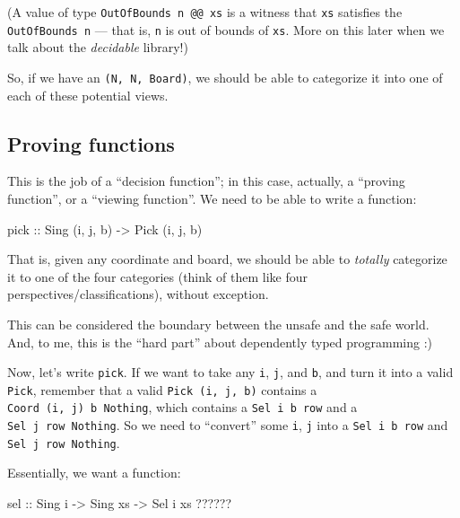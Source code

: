 \documentclass[]{article}
\newenvironment{Shaded}{}{}
\newcommand{\DataTypeTok}[1]{\textcolor[rgb]{0.56,0.13,0.00}{#1}}
\newcommand{\NormalTok}[1]{#1}
\newcommand{\OperatorTok}[1]{\textcolor[rgb]{0.40,0.40,0.40}{#1}}
\newcommand{\OtherTok}[1]{\textcolor[rgb]{0.00,0.44,0.13}{#1}}
\begin{document}
(A value of type \texttt{OutOfBounds\ n\ @@\ xs} is a witness that \texttt{xs}
satisfies the \texttt{OutOfBounds\ n} --- that is, \texttt{n} is out of bounds
of \texttt{xs}. More on this later when we talk about the \emph{decidable}
library!)

So, if we have an \texttt{(N,\ N,\ Board)}, we should be able to categorize it
into one of each of these potential views.

\subsection{Proving functions}\label{proving-functions}

This is the job of a ``decision function''; in this case, actually, a ``proving
function'', or a ``viewing function''. We need to be able to write a function:

\begin{Shaded}
\begin{Highlighting}[]
\OtherTok{pick ::} \DataTypeTok{Sing}\NormalTok{ \textquotesingle{}(i, j, b)}
     \OtherTok{{-}\textgreater{}} \DataTypeTok{Pick}\NormalTok{ \textquotesingle{}(i, j, b)}
\end{Highlighting}
\end{Shaded}

That is, given any coordinate and board, we should be able to \emph{totally}
categorize it to one of the four categories (think of them like four
perspectives/classifications), without exception.

This can be considered the boundary between the unsafe and the safe world. And,
to me, this is the ``hard part'' about dependently typed programming :)

Now, let's write \texttt{pick}. If we want to take any \texttt{i}, \texttt{j},
and \texttt{b}, and turn it into a valid \texttt{Pick}, remember that a valid
\texttt{Pick\ \textquotesingle{}(i,\ j,\ b)} contains a
\texttt{Coord\ \textquotesingle{}(i,\ j)\ b\ \textquotesingle{}Nothing}, which
contains a \texttt{Sel\ i\ b\ row} and a
\texttt{Sel\ j\ row\ \textquotesingle{}Nothing}. So we need to ``convert'' some
\texttt{i}, \texttt{j} into a \texttt{Sel\ i\ b\ row} and
\texttt{Sel\ j\ row\ \textquotesingle{}Nothing}.

Essentially, we want a function:

\begin{Shaded}
\begin{Highlighting}[]
\OtherTok{sel ::} \DataTypeTok{Sing}\NormalTok{ i}
    \OtherTok{{-}\textgreater{}} \DataTypeTok{Sing}\NormalTok{ xs}
    \OtherTok{{-}\textgreater{}} \DataTypeTok{Sel}\NormalTok{ i xs }\OperatorTok{??????}
\end{Highlighting}
\end{Shaded}
\end{document}
